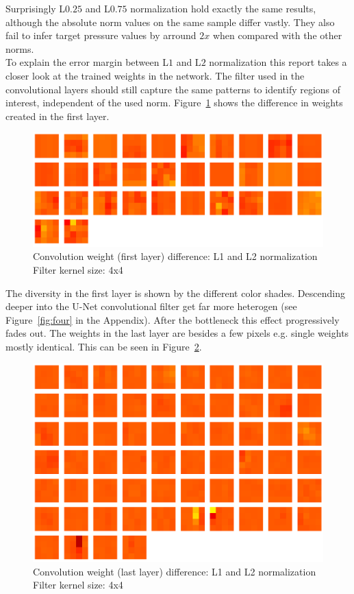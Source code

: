 \documentclass[acmtog]{techreportacmart}
\begin{document}
Surprisingly L$0.25$ and L$0.75$ normalization hold exactly the same results, although the absolute norm values on the same sample differ vastly. They also fail to infer target pressure values by arround $2x$ when compared with the other norms. \\
To explain the error margin between L$1$ and L$2$ normalization this report takes a closer look at the trained weights in the network. The filter used in the convolutional layers should still capture the same patterns to identify regions of interest, independent of the used norm. Figure~\ref{fig:seven} shows the  difference in weights created in the first layer. 

\begin{figure}[H]
  \includegraphics[width=.3\textwidth]{figures/weights_visualized/diff_layer_1_conv.png}
  \caption{Convolution weight (first layer) difference: L1 and L2 normalization \\ Filter kernel size: 4x4}
  \label{fig:seven}
\end{figure}

The diversity in the first layer is shown by the different color shades. Descending deeper into the U-Net convolutional filter get far more heterogen (see Figure~\ref{fig:four} in the Appendix). After the bottleneck this effect progressively fades out. The weights in the last layer are besides a few pixels e.g. single weights mostly identical. This can be seen in Figure~\ref{fig:eight}.

\begin{figure}[H]
  \includegraphics[width=.3\textwidth]{figures/weights_visualized/diff_layer_14_conv.png}
  \caption{Convolution weight (last layer) difference: L1 and L2 normalization \\ Filter kernel size: 4x4}
  \label{fig:eight}
\end{figure}
\end{document}
